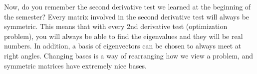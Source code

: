 Now, do you remember the second derivative test we learned at the beginning of the semester?  Every matrix involved in the second derivative test will always be symmetric.  This means that with every 2nd derivative test (optimization problem), you will always be able to find the eigenvalues and they will be real numbers.  
In addition, a basis of eigenvectors can be chosen to always meet at right angles. 
Changing bases is a way of rearranging how we view a problem, and symmetric matrices have extremely nice bases. 













